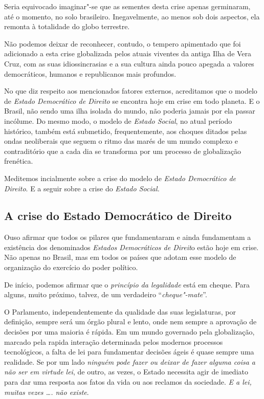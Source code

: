 Seria equivocado imaginar"-se que as sementes desta crise apenas
germinaram, até o momento, no solo brasileiro. Inegavelmente, ao menos
sob dois aspectos, ela remonta à totalidade do globo terrestre.

Não podemos deixar de reconhecer, contudo, o tempero apimentado que foi
adicionado a esta crise globalizada pelos atuais viventes da antiga Ilha
de Vera Cruz, com as suas idiossincrasias e a sua cultura ainda pouco
apegada a valores democráticos, humanos e republicanos mais profundos.

No que diz respeito aos mencionados fatores externos, acreditamos que o
modelo de \emph{Estado Democrático de Direito} se encontra hoje em crise
em todo planeta. E o Brasil, não sendo uma ilha isolada do mundo, não
poderia jamais por ela passar incólume. Do mesmo modo, o modelo de
\emph{Estado Social}, no atual período histórico, também está submetido,
frequentemente, aos choques ditados pelas ondas neoliberais que seguem o
ritmo das marés de um mundo complexo e contraditório que a cada dia se
transforma por um processo de globalização frenética.

Meditemos incialmente sobre a crise do modelo de \emph{Estado
Democrático de Direito}. E a seguir sobre a crise do \emph{Estado
Social.}

\subsection{A crise do Estado Democrático de Direito}

Ouso afirmar que todos os pilares que fundamentaram e ainda fundamentam
a existência dos denominados \emph{Estados Democráticos de Direit}o
estão hoje em crise. Não apenas no Brasil, mas em todos os países que
adotam esse modelo de organização do exercício do poder político.

De início, podemos afirmar que o \emph{princípio da legalidade} está em
cheque. Para alguns, muito próximo, talvez, de um verdadeiro
``\emph{cheque"-mate}''.

O Parlamento, independentemente da qualidade das suas legislaturas, por
definição, sempre será um órgão plural e lento, onde nem sempre a
aprovação de decisões por uma maioria é rápida. Em um mundo governado
pela globalização, marcado pela rapida interação determinada pelos
modernos processos tecnológicos, a falta de lei para fundamentar
decisões ágeis é quase sempre uma realidade. Se por um lado
\emph{ninguém pode fazer ou deixar de fazer alguma coisa a não ser em
virtude lei}, de outro, as vezes, o Estado necessita agir de imediato
para dar uma resposta aos fatos da vida ou aos reclamos da sociedade.
\emph{E a lei, muitas vezes \ldots{}. não existe}.

